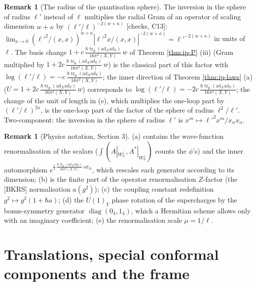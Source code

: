 \documentclass[11pt]{report}
\theoremstyle{plain}
\theoremstyle{definition}
\newtheorem{remark}[theorem]{Remark}
\numberwithin{equation}{chapter}
\newcommand{\unit}{\tfrac{\hbar\operatorname{tr}_{\mathfrak g}(\mathrm{ad}_X\mathrm{ad}_Y)}{16\pi^2(X,Y)}}
\newcommand{\Wp}{W_{\mathbb R}^\perp}
\begin{document}
\begin{remark}[The radius of the quantisation sphere]
\label{rem:ip-radius}
The inversion in the sphere of radius $\ell'$ instead of $\ell$ multiplies the radial Gram of an operator of scaling dimension $w+\kappa$ by $(\ell'/\ell)^{-2(w+\kappa)}$ [checks, C13]: $\lim_{x\to0}(\ell'^2/(x,x))^{w+\kappa}|\ell'^2x/(x,x)|^{-2(w+\kappa)}=\ell'^{-2(w+\kappa)}$ in units of $\ell$. The basis change $1+c\,\unit\,w$ of Theorem \ref{thm:ip-P} (iii) (Gram multiplied by $1+2c\,\unit\,w$) is the classical part of this factor with $\log(\ell'/\ell)=-c\,\unit$; the inner direction of Theorem \ref{thm:ip-laws} (a) ($U=1+2c\,\unit\,w$) corresponds to $\log(\ell'/\ell)=-2c\,\unit$; the change of the unit of length in (e), which multiplies the one-loop part by $(\ell'/\ell)^{2\kappa}$, is the one-loop part of the factor of the sphere of radius $\ell^2/\ell'$. Two-component: the inversion in the sphere of radius $\ell'$ is $x^m\mapsto\ell'^2x^m/x_nx_n$.
\end{remark}

\begin{remark}[Physics notation, Section 3]
(a) contains the wave-function renormalisation of the scalars ($\int(A|_{\Wp},A^*|_{\Wp})$ counts the $\phi$'s) and the inner automorphism $e^{\frac c2\,\unit\,\mathrm{ad}_\Delta}$, which rescales each generator according to its dimension; (b) is the finite part of the operator renormalisation $Z$-factor (the [BKRS] normalisation $a(g^2)$); (c) the coupling constant redefinition $g^2\mapsto g^2(1+\hbar a)$; (d) the $U(1)_Y$ phase rotation of the supercharges by the bonus-symmetry generator $\operatorname{diag}(0_4,1_4)$, which a Hermitian scheme allows only with an imaginary coefficient; (e) the renormalisation scale $\mu=1/\ell$.
\end{remark}

\section{Translations, special conformal components and the frame}
\label{sec:ip-P}
\end{document}
